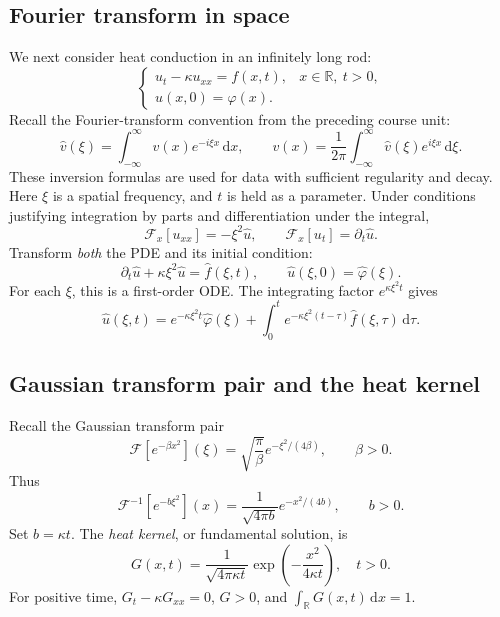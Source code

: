 \documentclass[11pt,a4paper]{article}
\newcommand{\dd}{\,\mathrm{d}}
\newcommand{\R}{\mathbb{R}}
\begin{document}
\subsection{Fourier transform in space}
We next consider heat conduction in an infinitely long rod:
\begin{equation}
 \begin{cases}
 u_t-\kappa u_{xx}=f(x,t),&x\in\R,\ t>0,\\
 u(x,0)=\varphi(x).
 \end{cases}
\end{equation}
Recall the Fourier-transform convention from the preceding course unit:
\begin{equation}
 \widehat v(\xi)=\int_{-\infty}^{\infty}v(x)e^{-i\xi x}\dd x,\qquad
 v(x)=\frac1{2\pi}\int_{-\infty}^{\infty}\widehat v(\xi)e^{i\xi x}\dd\xi.
\end{equation}
These inversion formulas are used for data with sufficient regularity and decay.
Here $\xi$ is a spatial frequency, and $t$ is held as a parameter. Under conditions
justifying integration by parts and differentiation under the integral,
\begin{equation}
 \mathcal F_x[u_{xx}]=-\xi^2\widehat u,\qquad
 \mathcal F_x[u_t]=\partial_t\widehat u.
\end{equation}
Transform \emph{both} the PDE and its initial condition:
\begin{equation}
 \partial_t\widehat u+\kappa\xi^2\widehat u=\widehat f(\xi,t),\qquad
 \widehat u(\xi,0)=\widehat\varphi(\xi).
\end{equation}
For each $\xi$, this is a first-order ODE. The integrating factor
$e^{\kappa\xi^2t}$ gives
\begin{equation}\label{eq:heattransformed}
 \widehat u(\xi,t)=e^{-\kappa\xi^2t}\widehat\varphi(\xi)
     +\int_0^t e^{-\kappa\xi^2(t-\tau)}\widehat f(\xi,\tau)\dd\tau.
\end{equation}

\subsection{Gaussian transform pair and the heat kernel}
Recall the Gaussian transform pair
\begin{equation}
 \mathcal F[e^{-\beta x^2}](\xi)=\sqrt{\frac\pi\beta}
                    e^{-\xi^2/(4\beta)},\qquad \beta>0.
\end{equation}
Thus
\begin{equation}
 \mathcal F^{-1}[e^{-b\xi^2}](x)=\frac1{\sqrt{4\pi b}}e^{-x^2/(4b)},\qquad b>0.
\end{equation}
Set $b=\kappa t$. The \emph{heat kernel}, or fundamental solution, is
\begin{equation}\label{eq:heatkernel}
 \boxed{G(x,t)=\frac1{\sqrt{4\pi\kappa t}}
                    \exp\left(-\frac{x^2}{4\kappa t}\right),\quad t>0.}
\end{equation}
For positive time, $G_t-\kappa G_{xx}=0$, $G>0$, and
$\int_\R G(x,t)\dd x=1$.
\end{document}
